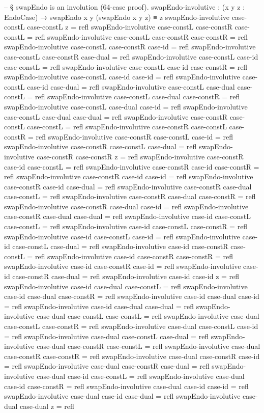 \documentclass[11pt,a4paper]{book}
\begin{document}
\begin{code}
-- § swapEndo is an involution (64-case proof).
swapEndo-involutive : (x y z : EndoCase) → swapEndo x y (swapEndo x y z) ≡ z
swapEndo-involutive case-constL case-constL z = refl
swapEndo-involutive case-constL case-constR case-constL = refl
swapEndo-involutive case-constL case-constR case-constR = refl
swapEndo-involutive case-constL case-constR case-id     = refl
swapEndo-involutive case-constL case-constR case-dual   = refl
swapEndo-involutive case-constL case-id     case-constL = refl
swapEndo-involutive case-constL case-id     case-constR = refl
swapEndo-involutive case-constL case-id     case-id     = refl
swapEndo-involutive case-constL case-id     case-dual   = refl
swapEndo-involutive case-constL case-dual   case-constL = refl
swapEndo-involutive case-constL case-dual   case-constR = refl
swapEndo-involutive case-constL case-dual   case-id     = refl
swapEndo-involutive case-constL case-dual   case-dual   = refl
swapEndo-involutive case-constR case-constL case-constL = refl
swapEndo-involutive case-constR case-constL case-constR = refl
swapEndo-involutive case-constR case-constL case-id     = refl
swapEndo-involutive case-constR case-constL case-dual   = refl
swapEndo-involutive case-constR case-constR z = refl
swapEndo-involutive case-constR case-id     case-constL = refl
swapEndo-involutive case-constR case-id     case-constR = refl
swapEndo-involutive case-constR case-id     case-id     = refl
swapEndo-involutive case-constR case-id     case-dual   = refl
swapEndo-involutive case-constR case-dual   case-constL = refl
swapEndo-involutive case-constR case-dual   case-constR = refl
swapEndo-involutive case-constR case-dual   case-id     = refl
swapEndo-involutive case-constR case-dual   case-dual   = refl
swapEndo-involutive case-id case-constL case-constL = refl
swapEndo-involutive case-id case-constL case-constR = refl
swapEndo-involutive case-id case-constL case-id     = refl
swapEndo-involutive case-id case-constL case-dual   = refl
swapEndo-involutive case-id case-constR case-constL = refl
swapEndo-involutive case-id case-constR case-constR = refl
swapEndo-involutive case-id case-constR case-id     = refl
swapEndo-involutive case-id case-constR case-dual   = refl
swapEndo-involutive case-id case-id z = refl
swapEndo-involutive case-id case-dual case-constL = refl
swapEndo-involutive case-id case-dual case-constR = refl
swapEndo-involutive case-id case-dual case-id     = refl
swapEndo-involutive case-id case-dual case-dual   = refl
swapEndo-involutive case-dual case-constL case-constL = refl
swapEndo-involutive case-dual case-constL case-constR = refl
swapEndo-involutive case-dual case-constL case-id     = refl
swapEndo-involutive case-dual case-constL case-dual   = refl
swapEndo-involutive case-dual case-constR case-constL = refl
swapEndo-involutive case-dual case-constR case-constR = refl
swapEndo-involutive case-dual case-constR case-id     = refl
swapEndo-involutive case-dual case-constR case-dual   = refl
swapEndo-involutive case-dual case-id     case-constL = refl
swapEndo-involutive case-dual case-id     case-constR = refl
swapEndo-involutive case-dual case-id     case-id     = refl
swapEndo-involutive case-dual case-id     case-dual   = refl
swapEndo-involutive case-dual case-dual z = refl
\end{code}
\end{document}

